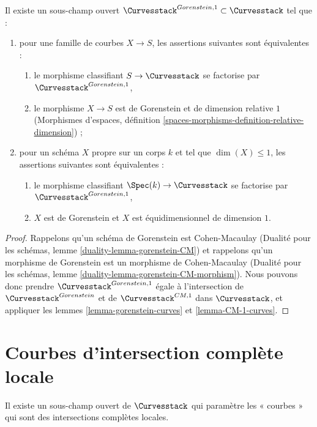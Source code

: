 \begin{lemma}
\label{lemma-gorenstein-1-curves}
Il existe un sous-champ ouvert
$\Curvesstack^{Gorenstein, 1} \subset \Curvesstack$ tel que :
\begin{enumerate}
\item pour une famille de courbes $X \to S$, les assertions suivantes sont équivalentes :
\begin{enumerate}
\item le morphisme classifiant $S \to \Curvesstack$ se factorise
par $\Curvesstack^{Gorenstein, 1}$,
\item le morphisme $X \to S$ est de Gorenstein et de
dimension relative $1$ (Morphismes d'espaces, définition
\ref{spaces-morphisms-definition-relative-dimension}) ;
\end{enumerate}
\item pour un schéma $X$ propre sur un corps $k$ et tel que $\dim(X) \leq 1$,
les assertions suivantes sont équivalentes :
\begin{enumerate}
\item le morphisme classifiant $\Spec(k) \to \Curvesstack$ se factorise
par $\Curvesstack^{Gorenstein, 1}$,
\item $X$ est de Gorenstein et $X$ est équidimensionnel de
dimension $1$.
\end{enumerate}
\end{enumerate}
\end{lemma}

\begin{proof}
Rappelons qu'un schéma de Gorenstein est Cohen-Macaulay
(Dualité pour les schémas, lemme \ref{duality-lemma-gorenstein-CM})
et rappelons
qu'un morphisme de Gorenstein est un morphisme de Cohen-Macaulay
(Dualité pour les schémas, lemme \ref{duality-lemma-gorenstein-CM-morphism}).
Nous pouvons donc prendre
$\Curvesstack^{Gorenstein, 1}$ égale à l'intersection
de $\Curvesstack^{Gorenstein}$ et de $\Curvesstack^{CM, 1}$
dans $\Curvesstack$, et appliquer les
lemmes \ref{lemma-gorenstein-curves} et \ref{lemma-CM-1-curves}.
\end{proof}






\section{Courbes d'intersection complète locale}
\label{section-lci}

\noindent
Il existe un sous-champ ouvert de $\Curvesstack$ qui paramètre
les « courbes » qui sont des intersections complètes locales.

